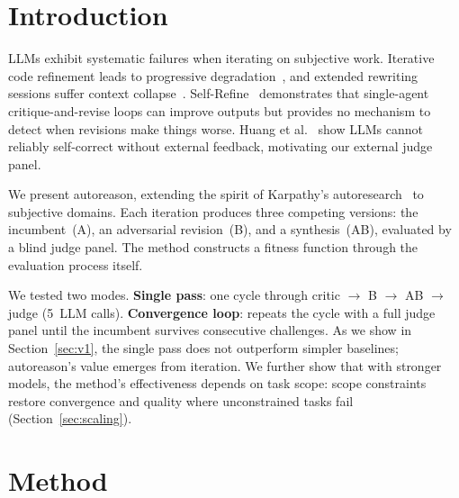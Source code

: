 \documentclass[10pt,twocolumn]{article}
\begin{document}
\section{Introduction}

LLMs exhibit systematic failures when iterating on subjective work. Iterative code refinement leads to progressive degradation~\cite{slopcodebench}, and extended rewriting sessions suffer context collapse~\cite{ace}. Self-Refine~\cite{selfrefine} demonstrates that single-agent critique-and-revise loops can improve outputs but provides no mechanism to detect when revisions make things worse. Huang et al.~\cite{huang2023} show LLMs cannot reliably self-correct without external feedback, motivating our external judge panel.

We present autoreason, extending the spirit of Karpathy's autoresearch~\cite{autoresearch} to subjective domains. Each iteration produces three competing versions: the incumbent~(A), an adversarial revision~(B), and a synthesis~(AB), evaluated by a blind judge panel. The method constructs a fitness function through the evaluation process itself.

We tested two modes. \textbf{Single pass}: one cycle through critic $\to$ B $\to$ AB $\to$ judge (5~LLM calls). \textbf{Convergence loop}: repeats the cycle with a full judge panel until the incumbent survives consecutive challenges. As we show in Section~\ref{sec:v1}, the single pass does not outperform simpler baselines; autoreason's value emerges from iteration. We further show that with stronger models, the method's effectiveness depends on task scope: scope constraints restore convergence and quality where unconstrained tasks fail (Section~\ref{sec:scaling}).

\section{Method}
\end{document}
